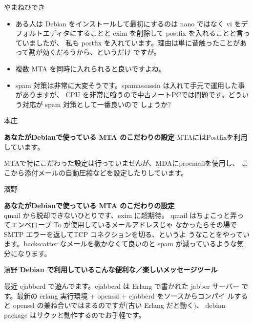 \documentclass[cjk,dvipdfmx,12pt]{beamer}
\begin{document}
\begin{frame}{やまねひでき}
\begin{itemize}
\item ある人は Debian をインストールして最初にするのは nano ではなく vi
をデフォルトエディタにすることと exim を削除して postfix を入れることと言っていましたが、
私も postfix を入れています。理由は単に昔触ったことがあって勘が効くだろうから、というだけ
ですが。

\item 複数 MTA を同時に入れられると良いですよね。

\item spam 対策は非常に大変そうです。spamassassin は入れて手元で運用した事がありますが、
CPU を非常に喰うので中古ノートPCでは問題です。どういう対応が spam 対策として一番良いので
しょうか?
\end{itemize}
\end{frame}


\begin{frame}{本庄}

\textbf{あなたがDebianで使っている MTA のこだわりの設定}
MTAにはPostfixを利用しています。

MTAで特にこだわった設定は行っていませんが、MDAにprocmailを使用し、
ここから添付メールの自動圧縮などを設定したりしています。

\end{frame}

\begin{frame}{濱野}

\textbf{あなたがDebianで使っている MTA のこだわりの設定}
\\
qmail から脱却できないひとりです、exim に超期待。
qmail はちょこっと弄ってエンベロープ To が使用しているメールアドレスじゃ
なかったらその場で SMTP エラーを返してTCP コネクションを切る、というよ
うなことをやっています。backscatter なメールを撒かなくて良いのと spam
が減っているような気分になります。

\end{frame}

\begin{frame}{濱野}
\textbf{Debian で利用しているこんな便利な／楽しいメッセージツール}

最近 ejabberd で遊んでます。ejabberd は Erlang で書かれた jabber サーバー
です。最新の erlang 実行環境 + openssl + ejabberd をソースからコンパイ
ルすると openssl の兼ね合いではまるのですが(古い Erlang だと動く)、
debian package はサクッと動作するのでお手軽です。

\end{frame}
\end{document}
